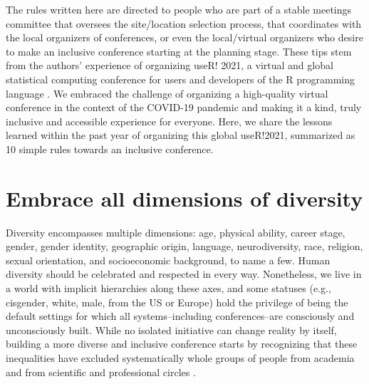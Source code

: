 \documentclass[10pt,letterpaper]{article}
\begin{document}
The rules written here are directed to people who are part of a stable meetings committee that oversees the site/location selection process, that coordinates with the local organizers of conferences, or even the local/virtual organizers who desire to make an inclusive conference starting at the planning stage.
These tips stem from the authors' experience of organizing useR! 2021, a virtual and global statistical computing conference for users and developers of the R programming language \cite{r_core_team_2021}. 
We embraced the challenge of organizing a high-quality virtual conference in the context of the COVID-19 pandemic and making it a kind, truly inclusive and accessible experience for everyone. 
Here, we share the lessons learned within the past year of organizing this global useR!2021, summarized as 10 simple rules towards an inclusive conference.


\section{Embrace all dimensions of diversity}
\label{rule_diversity}

Diversity encompasses multiple dimensions: age, physical ability, career stage, gender, gender identity, geographic origin, language, neurodiversity, race, religion, sexual orientation, and socioeconomic background, to name a few. 
Human diversity should be celebrated and respected in every way. Nonetheless, we live in a world with implicit hierarchies along these axes, and some statuses (e.g., cisgender, white, male, from the US or Europe) hold the privilege of being the default settings for which all systems--including conferences--are consciously and unconsciously built.  
While no isolated initiative can change reality by itself, building a more diverse and inclusive conference starts by recognizing that these inequalities have excluded systematically whole groups of people from academia and from scientific and professional circles \cite{timperleyHeMoanaPukepuke2020}. 
\end{document}
